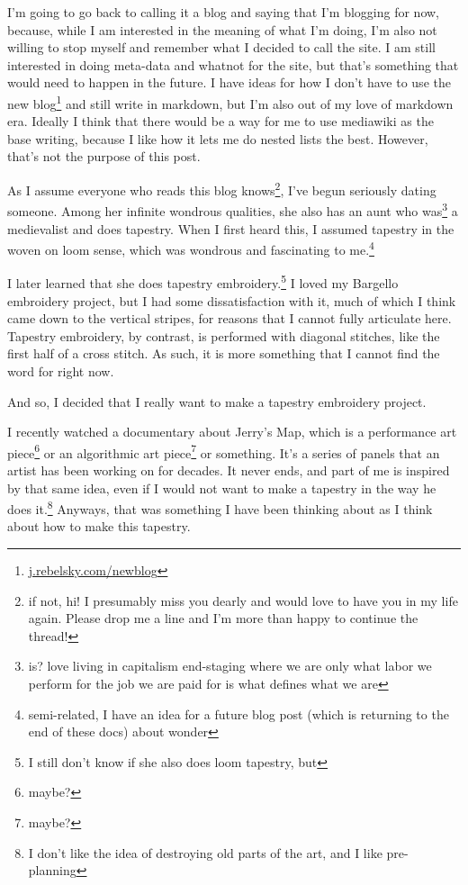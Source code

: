 \documentclass[12pt]{article}
\renewcommand{\,}{\textsuperscript{,}}
\begin{document}
I'm going to go back to calling it a blog and saying that I'm blogging for now, because, while I am interested in the meaning of what I'm doing, I'm also not willing to stop myself and remember what I decided to call the site.  
I am still interested in doing meta-data and whatnot for the site, but that's something that would need to happen in the future.  
I have ideas for how I don't have to use the new blog\footnote{\href{j.rebelsky.com/newblog}{j.rebelsky.com/newblog}} and still write in markdown, but I'm also out of my love of markdown era.  
Ideally I think that there would be a way for me to use mediawiki as the base writing, because I like how it lets me do nested lists the best.  
However, that's not the purpose of this post.

As I assume everyone who reads this blog knows\footnote{if not, hi! I presumably miss you dearly and would love to have you in my life again. Please drop me a line and I'm more than happy to continue the thread!}, I've begun seriously dating someone.  
Among her infinite wondrous qualities, she also has an aunt who was\footnote{is? love living in capitalism end-staging where we are only what labor we perform for the job we are paid for is what defines what we are} a medievalist and does tapestry.  
When I first heard this, I assumed tapestry in the woven on loom sense, which was wondrous and fascinating to me.\footnote{semi-related, I have an idea for a future blog post (which is returning to the end of these docs) about wonder}

I later learned that she does tapestry embroidery.\footnote{I still don't know if she also does loom tapestry, but}  
I loved my Bargello embroidery project, but I had some dissatisfaction with it, much of which I think came down to the vertical stripes, for reasons that I cannot fully articulate here.  
Tapestry embroidery, by contrast, is performed with diagonal stitches, like the first half of a cross stitch.  
As such, it is more something that I cannot find the word for right now.

And so, I decided that I really want to make a tapestry embroidery project.

I recently watched a documentary about Jerry's Map, which is a performance art piece\footnote{maybe?} or an algorithmic art piece\footnote{maybe?} or something.  
It's a series of panels that an artist has been working on for decades.  
It never ends, and part of me is inspired by that same idea, even if I would not want to make a tapestry in the way he does it.\footnote{I don't like the idea of destroying old parts of the art, and I like pre-planning}  
Anyways, that was something I have been thinking about as I think about how to make this tapestry.
\end{document}
